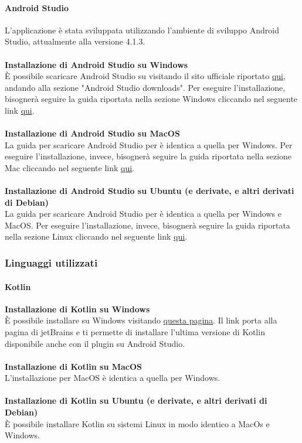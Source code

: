 \paragraph{Android Studio}
L'applicazione è stata sviluppata utilizzando l'ambiente di sviluppo Android Studio, attualmente alla versione 4.1.3.
\\
\\
\textbf{Installazione di Android Studio su Windows}
\\
È possibile scaricare Android Studio su  visitando il sito ufficiale riportato \href{https://developer.android.com/studio}{qui}, andando alla sezione "Android Studio downloads".
Per eseguire l'installazione, bisognerà seguire la guida riportata nella sezione Windows cliccando nel seguente link \href{https://developer.android.com/studio/install#windows}{qui}.
\\
\\
\textbf{Installazione di Android Studio su MacOS}
\\
La guida per scaricare Android Studio per  è identica a quella per Windows.
Per eseguire l'installazione, invece, bisognerà seguire la guida riportata nella sezione Mac cliccando nel seguente link \href{https://developer.android.com/studio/install#mac}{qui}.
\\
\\
\textbf{Installazione di Android Studio su Ubuntu (e derivate, e altri derivati di Debian)}
\\
La guida per scaricare Android Studio per  è identica a quella per Windows e MacOS.
Per eseguire l'installazione, invece, bisognerà seguire la guida riportata nella sezione Linux cliccando nel seguente link \href{https://developer.android.com/studio/install#linux}{qui}.
\\
\subsubsection{Linguaggi utilizzati}

\paragraph{Kotlin}
\textbf{Installazione di Kotlin su Windows}
\\
È possibile installare  su Windows visitando \href{https://plugins.jetbrains.com/plugin/6954-kotlin/versions}{questa pagina}.
Il link porta alla pagina di jetBrains e ti permette di installare l'ultima versione di Kotlin disponibile anche con il plugin su Android Studio.
\\
\\
\textbf{Installazione di Kotlin su MacOS}
\\
L'installazione per MacOS è identica a quella per Windows.
\\
\\
\textbf{Installazione di Kotlin su Ubuntu (e derivate, e altri derivati di Debian)}
\\
È possibile installare Kotlin su sistemi Linux in modo identico a MacOs e Windows.

